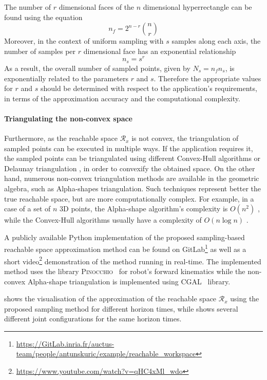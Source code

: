 The number of $r$ dimensional faces of the $n$ dimensional hyperrectangle can be found using the equation
$$
n_f = 2^{n-r}\binom{n}{r}
$$
Moreover, in the context of uniform sampling with $s$ samples along each axis, the number of samples per $r$ dimensional face has an exponential relationship
$$
n_s = s^r
$$
As a result, the overall number of sampled points, given by $N_s = n_fn_s$, is exponentially related to the parameters $r$ and $s$. Therefore the appropriate values for $r$ and $s$ should be determined with respect to the application's requirements, in terms of the approximation accuracy and the computational complexity. 

\paragraph*{Triangulating the non-convex space}
Furthermore, as the reachable space $\mathcal{R}_x$ is not convex, the triangulation of sampled points can be executed in multiple ways. If the application requires it, the sampled points can be triangulated using different Convex-Hull algorithms or Delaunay triangulation \cite{Lo1989Delaunay}, in order to convexify the obtained space. On the other hand, numerous non-convex triangulation methods are available in the geometric algebra, such as Alpha-shapes \cite{Edelsbrunner1994AlphaShape} triangulation. Such techniques represent better the true reachable space, but are more computationally complex. For example, in a case of a set of $n$ 3D points, the Alpha-shape algorithm's complexity is $O(n^2)$ \cite{Edelsbrunner1994AlphaShape}, while the Convex-Hull algorithms usually have a complexity of $O(n\log n)$ \cite{Barber1996}. 

A publicly available Python implementation of the proposed sampling-based reachable space approximation method can be found on GitLab\footnote{\url{https://GitLab.inria.fr/auctus-team/people/antunskuric/example/reachable_workspace}} as well as a short video\footnote{\url{https://www.youtube.com/watch?v=qHC4xMl_wdo}} demonstration of the method running in real-time. The implemented method uses the library \textsc{Pinocchio}~\cite{pinocchio2021} for robot's forward kinematics while the non-convex Alpha-shape triangulation is implemented using \textsc{CGAL}~\cite{cgal3Dalpha} library.

 shows the visualisation of the approximation of the reachable space $\mathcal{R}_x$ using the proposed sampling method for different horizon times, while  shows several different joint configurations for the same horizon times.

